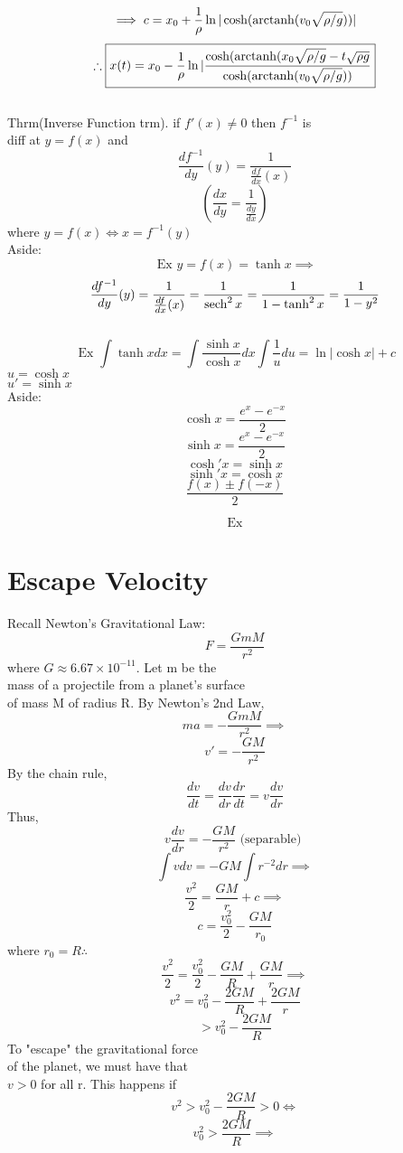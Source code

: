   \[ \implies c = x_0 + \frac{1}{\rho} \ln | \cosh ( \operatorname{arctanh} (v_0
  \sqrt{\rho/g}))| \]
  \[ \therefore \boxed{ x(t) = x_0 - \frac{1}{\rho} \ln | \frac{\cosh
  (\operatorname{arctanh} (x_0 \sqrt{\rho/g} -t \sqrt{\rho g}}{ \cosh( \operatorname{arctanh} (v_0
  \sqrt{\rho/g}))}} \]
  \\[5mm]
  Thrm(Inverse Function trm). if \( f'(x) \neq 0 \) then \( f^{-1}\) is \\
  diff at \( y= f(x) \) and 
  \[ \frac{df^{-1}}{dy}(y) = \frac{1}{ \frac{df}{dx} (x) } \]
  \[ ( \frac{dx}{dy} = \frac{1}{ \frac{dy}{dx}}) \]
  where \( y = f(x) \iff x = f^{-1}(y) \) \\[5mm]
  Aside:
  \[ \text{ Ex } y = f(x) = \tanh x \implies \]
  \[ \frac{df^{-1}}{dy}(y) = \frac{1}{ \frac{df}{dx}(x)} =
  \frac{1}{\operatorname{sech}^2 x} = \frac{1}{1-\tanh^2 x} = \frac{1}{1-y^2} \]
  \\[5mm]
  \[ \text{ Ex } \int \tanh x dx = \int \frac{\sinh x}{\cosh x}dx \int
  \frac{1}{u} du = \ln|\cosh x | + c \]
  \( u = \cosh x \) \\
  \( u' = \sinh x \) \\[5mm]
  Aside: 
  \[ \cosh x = \frac{e^x - e^{-x} }{2} \]
  \[ \sinh x =\frac{e^x - e^{-x} }{2}  \]
  \[ \cosh'x = \sinh x \]
  \[ \sinh'x = \cosh x \]
  \[ \frac{f(x) \pm f(-x)}{2} \]

  \[ \text{ Ex }  \]


  \newpage
\section{Escape Velocity}
  Recall Newton's Gravitational Law:
  \[ F = \frac{GmM}{r^2} \]
  where \( G \approx 6.67 \times 10^{-11}\). Let m be the \\
  mass of a projectile from a planet's surface \\
  of mass M of radius R. By 
  Newton's 2nd Law, 
  \[ ma = -\frac{GmM}{r^2} \implies \]
  \[ v' = -\frac{GM}{r^2} \]
  By the chain rule, 
  \[ \frac{dv}{dt} = \frac{dv}{dr} \frac{dr}{dt} = v \frac{dv}{dr} \]
  Thus, 
  \[ v \frac{dv}{dr} = -\frac{GM}{r^2} \text{ (separable) } \]
  \[ \int v dv = -GM \int r^{-2} dr \implies \]
  \[ \frac{v^2}{2} =  \frac{GM}{r} + c \implies \]
  \[ c = \frac{v_0^2}{2} - \frac{GM}{r_0} \]
  where \( r_0 = R \therefore \)
  \[ \frac{v^2}{2} = \frac{v_0^2}{2} - \frac{GM}{R} + \frac{GM}{r}
  \implies \]
  \[ v^2 = v_0^2 - \frac{2GM}{R} + \frac{2GM}{r} \]
  \[ > v_0^2 - \frac{2GM}{R} \]
  To "escape" the gravitational force \\
  of the planet, we must have that \\
  \( v>0 \) for all r. This happens if 
  \[ v^2 > v_0^2 - \frac{2GM}{R} > 0 \iff \]
  \[ v_0^2 > \frac{2GM}{R} \implies \]

